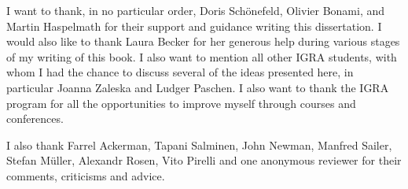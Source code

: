 \addchap{\lsAcknowledgementTitle}

I want to thank, in no particular order, Doris Schönefeld, Olivier Bonami, and Martin Haspelmath for their support and guidance writing this dissertation. I would also like to thank Laura Becker for her generous help during various stages of my writing of this book. I  also want to mention all other IGRA students, with whom I had the chance to discuss several of the ideas presented here, in particular Joanna Zaleska and Ludger Paschen. I also want to thank the IGRA program for all the opportunities to improve myself through courses and conferences.

I also thank Farrel Ackerman, Tapani Salminen, John Newman, Manfred Sailer, Stefan Müller, Alexandr Rosen, Vito Pirelli and one anonymous reviewer for their comments, criticisms and advice.




